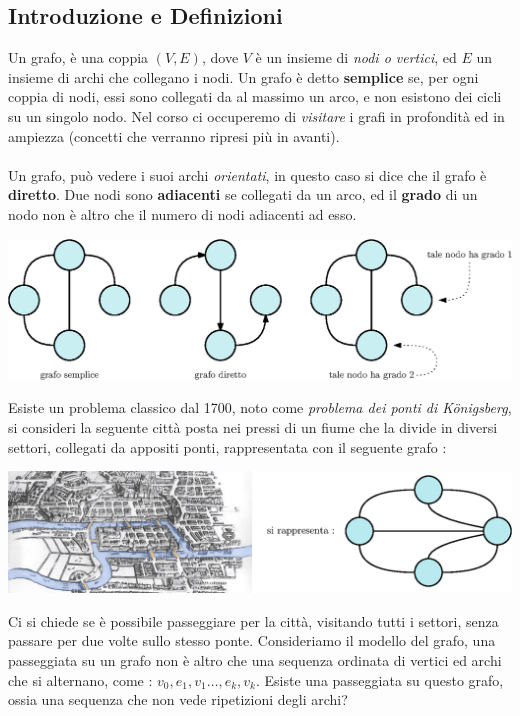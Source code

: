 \documentclass[12pt, letterpaper]{article}
\newcommand{\acc}{\\\hphantom{}\\}
\begin{document}
\subsection{Introduzione e Definizioni}
Un grafo, è una coppia $(V,E)$, dove $V$ è un insieme di \textit{nodi o vertici}, ed $E$ un
insieme di archi che collegano i nodi. Un grafo è detto \textbf{semplice} se, per ogni
coppia di nodi, essi sono collegati da al massimo un arco, e non esistono dei cicli su
un singolo nodo. Nel corso ci occuperemo di \textit{visitare} i grafi in
profondità ed in ampiezza (concetti che verranno ripresi più in avanti). \acc
Un grafo, può vedere i suoi archi \textit{orientati}, in questo caso si dice che
il grafo è \textbf{diretto}. Due nodi sono \textbf{adiacenti} se collegati da un arco,
ed il \textbf{grado} di un nodo non è altro che il numero di nodi adiacenti ad esso.\begin{center}
    \includegraphics[width=1\textwidth ]{images/defGrafi.eps}
\end{center}
Esiste un problema classico dal 1700, noto come \textit{problema dei ponti di Königsberg},
si consideri la seguente città posta nei pressi di un fiume che la divide in diversi settori, collegati
da appositi ponti, rappresentata con il seguente grafo :\begin{center}
    \includegraphics[width=1\textwidth ]{images/konigsberg.eps}
\end{center}
Ci si chiede se è possibile passeggiare per la città, visitando tutti i settori, senza passare per due volte
sullo stesso ponte. Consideriamo il modello del grafo, una passeggiata su un grafo non è altro che una
sequenza ordinata di vertici ed archi che si alternano, come : $v_0,e_1,v_1\dots, e_k,v_k$.
Esiste una passeggiata su questo grafo, ossia una sequenza che non vede ripetizioni degli archi?\acc
\end{document}
